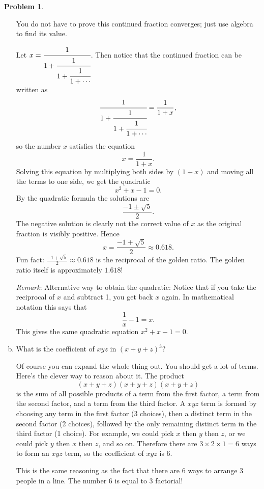 \documentclass[11pt,oneside]{amsart}
\theoremstyle{definition}
\newtheorem{problem}{Problem}
\begin{document}
\begin{problem}
\begin{enumerate}[(a)]
            You do not have to prove this continued fraction converges; just use algebra to find its value.
            \begin{solution}
                Let $x=\cfrac 1{1+\cfrac 1{1+\cfrac 1{1+\cdots}}}$. Then notice that the continued fraction can be written as
                \[\cfrac 1{1+\cfrac 1{1+\cfrac 1{1+\cdots}}}=\frac 1{1+x},\]
                so the number $x$ satisfies the equation
                \[x=\frac 1{1+x}.\]
                Solving this equation by multiplying both sides by $(1+x)$ and moving all the terms to one side, we get the quadratic
                \[x^2+x-1=0.\]
                By the quadratic formula the solutions are
                \[\frac{-1\pm\sqrt 5}2.\]
                The negative solution is clearly not the correct value of $x$ as the original fraction is visibly positive. Hence
                \[x=\frac{-1+\sqrt 5}2\approx 0.618.\]
                Fun fact: $\frac{-1+\sqrt 5}2\approx 0.618$ is the reciprocal of the golden ratio. The golden ratio itself is approximately $1.618$!

                \emph{Remark}: Alternative way to obtain the quadratic: Notice that if you take the reciprocal of $x$ and subtract 1, you get back $x$ again. In mathematical notation this says that
                \[\frac 1x-1=x.\]
                This gives the same quadratic equation $x^2+x-1=0$.
            \end{solution}
            \item What is the coefficient of $xyz$ in $(x+y+z)^3$?
            \begin{solution}
                Of course you can expand the whole thing out. You should get a lot of terms. Here's the clever way to reason about it. The product
                \[(x+y+z)(x+y+z)(x+y+z)\]
                is the sum of all possible products of a term from the first factor, a term from the second factor, and a term from the third factor. A $xyz$ term is formed by choosing any term in the first factor (3 choices), then a distinct term in the second factor (2 choices), followed by the only remaining distinct term in the third factor (1 choice). For example, we could pick $x$ then $y$ then $z$, or we could pick $y$ then $x$ then $z$, and so on. Therefore there are $3\times 2\times 1=6$ ways to form an $xyz$ term, so the coefficient of $xyz$ is 6.

                This is the same reasoning as the fact that there are 6 ways to arrange 3 people in a line. The number 6 is equal to 3 factorial!
            \end{solution}
            

\end{enumerate}
\end{problem}
\end{document}
